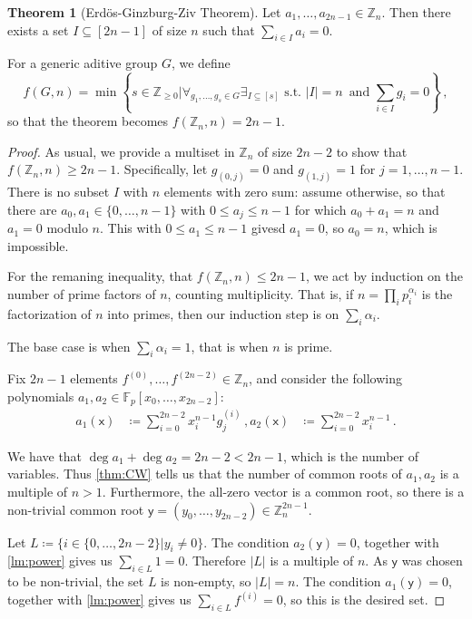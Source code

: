 \documentclass[12pt]{amsart}
\theoremstyle{definition}
\newtheorem{thm}{Theorem}[section]
\newcommand{\Z}{\mathbb{Z}}
\newcommand{\F}{\mathbb{F}}
\newcommand{\vx}{\mathsf{x}}
\newcommand{\vy}{\mathsf{y}}
\begin{document}
\begin{thm}[Erd\"os-Ginzburg-Ziv Theorem]
Let $a_1, \ldots, a_{2n-1} \in \Z_n $.
Then there exists a set $I\subseteq [2n-1] $ of size $n$ such that $\sum_{i\in I} a_i = 0$.
\end{thm}

For a generic aditive group $G$, we define
$$ f(G, n) = \min \left\{ s \in \Z_{\geq 0} \Big| \forall_{g_1, \ldots, g_s \in G} \exists_{I \subseteq [s]} \text{ s.t. } |I| = n \, \text{ and } \sum_{i \in I} g_i = 0 \right\} \, ,$$
so that the theorem becomes $ f(\Z_n, n) = 2n - 1$.

\begin{proof}
As usual, we provide a multiset in $\Z_n$ of size $2n-2$ to show that $f(\Z_n, n) \geq 2n-1$.
Specifically, let $g_{(0, j)} = 0$ and $g_{(1, j)} = 1$ for $j=1, \ldots, n-1$.
There is no subset $I$ with $n$ elements with zero sum:
assume otherwise, so that there are $a_0, a_1 \in \{0, \ldots, n-1\}$ with $0 \leq a_j \leq n-1$ for which $a_0 + a_1 = n$ and $ a_1 = 0$ modulo $n$.
This with $0 \leq a_1 \leq n-1$ givesd $a_1 = 0$, so $a_0 = n$, which is impossible.


For the remaning inequality, that $f(\Z_n, n) \leq 2n - 1$, we act by induction on the number of prime factors of $n$, counting multiplicity.
That is, if $n = \prod_i p_i^{\alpha_i}$ is the factorization of $n$ into primes, then our induction step is on $\sum_i \alpha_i$.

The base case is when $\sum_i \alpha_i = 1$, that is when $n$ is prime.

Fix $2n - 1$ elements $f^{(0)}, \ldots, f^{(2n  - 2 )} \in \Z_n$, and consider the following polynomials $a_1, a_2 \in \F_p[x_0, \ldots, x_{2n  - 2 }]$:
\begin{align*}
a_1(\vx ) &\coloneqq \sum_{i=0}^{2n-2} x_i^{n-1}g^{(i)}_j \, ,
a_2(\vx ) &\coloneqq \sum_{i=0}^{2n-2} x_i^{n-1} \, .
\end{align*}

We have that $\deg a_1 + \deg a_2 = 2n-2 < 2n-1$, which is the number of variables.
Thus \cref{thm:CW} tells us that the number of common roots of $a_1, a_2$ is a multiple of $n > 1$.
Furthermore, the all-zero vector is a common root, so there is a non-trivial common root $\vy = (y_0 , \ldots, y_{2n-2}) \in \Z_n^{2n-1}$.


Let $L \coloneqq \{ i\in\{0, \ldots, 2n - 2\} | y_i \neq 0 \}$.
The condition $a_2(\vy) = 0$, together with \cref{lm:power} gives us $\sum_{i\in L} 1 = 0$.
Therefore $|L|$ is a multiple of $n$.
As $\vy $ was chosen to be non-trivial, the set $L$ is non-empty, so $|L| = n$.
The condition $a_1(\vy) = 0$, together with \cref{lm:power} gives us $\sum_{i\in L} f^{(i)} = 0$, so this is the desired set.


\end{proof}
\end{document}
